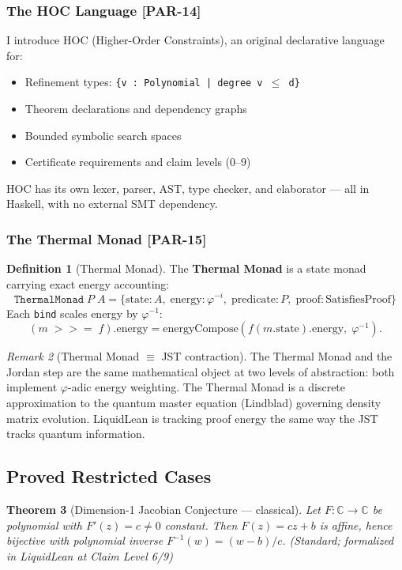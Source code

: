 \documentclass[12pt, letterpaper]{article}
\theoremstyle{plain}
\newtheorem{theorem}{Theorem}[section]
\theoremstyle{definition}
\newtheorem{definition}[theorem]{Definition}
\theoremstyle{remark}
\newtheorem{remark}[theorem]{Remark}
\newcommand{\phiinv}{\varphi^{-1}}
\newcommand{\prior}[1]{\textcolor{SovGold}{\textbf{[PAR-#1]}}}
\begin{document}
\subsubsection{The HOC Language \prior{14}}

I introduce HOC (Higher-Order Constraints), an original declarative language for:
\begin{itemize}[nosep]
  \item Refinement types: \texttt{\{v : Polynomial | degree v $\leq$ d\}}
  \item Theorem declarations and dependency graphs
  \item Bounded symbolic search spaces
  \item Certificate requirements and claim levels (0--9)
\end{itemize}
HOC has its own lexer, parser, AST, type checker, and elaborator --- all in
Haskell, with no external SMT dependency.

\subsubsection{The Thermal Monad \prior{15}}

\begin{definition}[Thermal Monad]
The \textbf{Thermal Monad} is a state monad carrying exact energy accounting:
\[
  \texttt{ThermalMonad}\;P\;A = \{
    \text{state}: A,\;
    \text{energy}: \varphi^{-i},\;
    \text{predicate}: P,\;
    \text{proof}: \text{SatisfiesProof}
  \}
\]
Each \texttt{bind} scales energy by $\phiinv$:
\[
  (m \;{>}{>}{=}\; f).\text{energy} = \text{energyCompose}(f(m.\text{state}).\text{energy},\;\varphi^{-1}).
\]
\end{definition}

\begin{remark}[Thermal Monad $\equiv$ JST contraction]
The Thermal Monad and the Jordan step are the same mathematical object at two
levels of abstraction: both implement $\varphi$-adic energy weighting.
The Thermal Monad is a discrete approximation to the quantum master equation
(Lindblad) governing density matrix evolution.
LiquidLean is tracking proof energy the same way the JST tracks quantum information.
\end{remark}

\subsection{Proved Restricted Cases}

\begin{theorem}[Dimension-1 Jacobian Conjecture --- classical]
Let $F: \mathbb{C} \to \mathbb{C}$ be polynomial with $F'(z) = c \neq 0$ constant.
Then $F(z) = cz + b$ is affine, hence bijective with polynomial inverse $F^{-1}(w) = (w-b)/c$.
\hfill\textit{(Standard; formalized in LiquidLean at Claim Level 6/9)}
\end{theorem}
\end{document}
